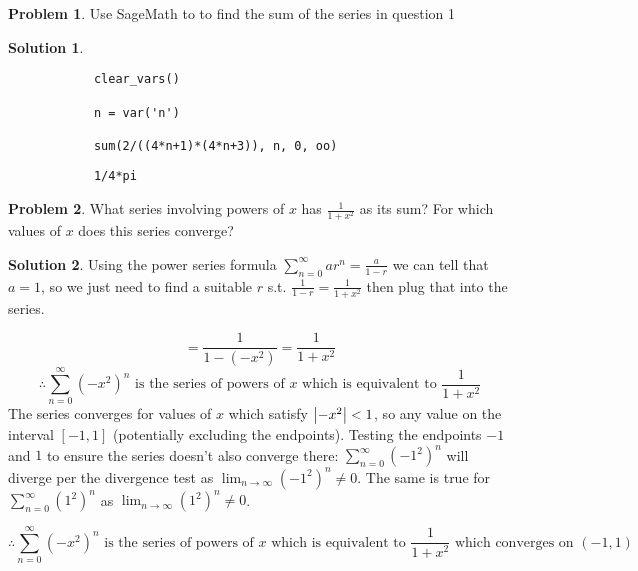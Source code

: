 \documentclass[10pt]{article}
\makeatletter
\theoremstyle{definition}
\newtheorem{problem}{Problem}
\newtheorem{soln}{Solution}
\newcommand{\boxspacing}{\kern\kvtcb@left@rule\kern\kvtcb@boxsep}
\newcommand{\prompt}[4]{
    \ttfamily\llap{{\color{#2}[#3]:\hspace{3pt}#4}}\vspace{-\baselineskip}
}
\makeatother
\begin{document}
\newpage

\begin{problem}
Use SageMath to to find the sum of the series in question 1
\end{problem}
\begin{soln} ~\\
    \begin{tcolorbox}[breakable, size=fbox, boxrule=1pt, pad at break*=1mm,colback=cellbackground, colframe=cellborder]
        \prompt{In}{incolor}{1}{\boxspacing}
        \begin{verbatim}
            clear_vars()

            n = var('n')
            
            sum(2/((4*n+1)*(4*n+3)), n, 0, oo)
        \end{verbatim}
    \end{tcolorbox}
    \begin{tcolorbox}[breakable, size=fbox, boxrule=.5pt, pad at break*=1mm, opacityfill=0]
        \prompt{Out}{outcolor}{1}{\boxspacing}
        \begin{verbatim}
            1/4*pi
        \end{verbatim}
    \end{tcolorbox}
\end{soln}

\begin{problem}
What series involving powers of $x$ has $\frac{1}{1+x^2}$ as its sum? For which values of $x$ does this series converge?
\end{problem}
\begin{soln} Using the power series formula $\sum_{n = 0}^{\infty} ar^n=\frac{a}{1-r}$ we can tell that $a=1$, so we just need to find a suitable $r$ s.t.
    $\frac{1}{1-r}=\frac{1}{1+x^2}$ then plug that into the series.

    $$=\frac{1}{1-(-x^2)}=\frac{1}{1+x^2}$$
    $$\therefore \sum_{n = 0}^{\infty} (-x^2)^n \text{ is the series of powers of } x \text{ which is equivalent to } \frac{1}{1+x^2}$$
    The series converges for values of $x$ which satisfy $\abs{-x^2}<1$, so any value on the interval $[-1,1]$ (potentially excluding the endpoints).
    Testing the endpoints $-1$ and $1$ to ensure the series doesn't also converge there: $\sum_{n = 0}^{\infty} (-1^2)^n$ will diverge per the divergence test
    as $\lim_{n \to \infty} (-1^2)^n \neq 0$. The same is true for $\sum_{n = 0}^{\infty} (1^2)^n$ as $\lim_{n \to \infty} (1^2)^n \neq 0$.

    $$\therefore \sum_{n = 0}^{\infty} (-x^2)^n \text{ is the series of powers of } x \text{ which is equivalent to } \frac{1}{1+x^2} \text { which converges on } (-1,1) $$
\end{soln}
\end{document}
